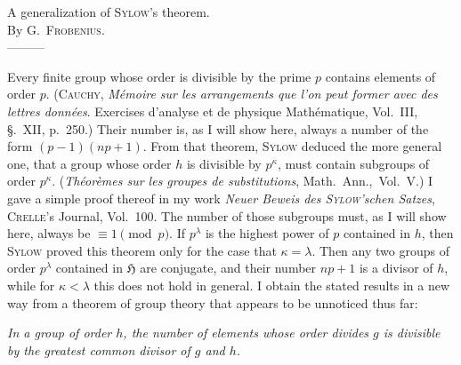 \documentclass[a5paper,12pt]{article}
\newcommand{\secformat}[1]{\centering{\normalfont\normalsize{#1}}}
\let\fr\mathfrak
\newcommand{\CH}{\fr{H}}
\newcommand{\?}{{\color{blue}${}^{(?)}$}}
\newcounter{origpagecounter}{}
\newcommand{\origpagefirst}[1]{\smash{\setcounter{origpagecounter}{#1}\mark{\arabic{origpagecounter}}}}
\begin{document}

\thispagestyle{empty}
\origpagefirst{981}

\begin{center}
	{\Large
		{A generalization of \textsc{Sylow}'s theorem.}
		\\
	}
	{\large
		{By \textsc{G.~Frobenius}.}
		\\
		---------
	}
\end{center}



\noindent
%
Every finite group whose order
is divisible by the prime $p$
contains elements of order $p$.
%
%
(\textsc{Cauchy}, 
\emph{M\'emoire sur les arrangements que l'on peut former avec des lettres donn\'ees}.
Exercises d'analyse et de physique Math\'ematique,
Vol.~III,
\S.~XII,
p.~250.)
%
%
Their number is, 
as I will show here,
always a number of the form 
$(p - 1) (n p + 1)$.
%
%
From that theorem,
\textsc{Sylow} deduced the more general one,
that a group
whose order $h$ is divisible by $p^\kappa$,
must contain subgroups of order $p^\kappa$.
%
%
(\emph{Th\'eor\`emes sur les groupes de substitutions},
Math.~Ann.,~Vol.~V.)
%
%
I gave a simple proof thereof
in my work
\emph{Neuer Beweis des \textsc{Sylow}'schen Satzes},
\textsc{Crelle}'s Journal,
Vol.~100.
%
%
The number of those subgroups must,
as I will show here,
always be $\equiv 1 \pmod{p}$.
%
%
If $p^\lambda$ is the highest power of $p$
contained in $h$,
then \textsc{Sylow} proved this theorem
only for the case that $\kappa = \lambda$.
%
%
Then any two groups of order $p^\lambda$ 
contained in $\CH$
are conjugate,
and their number $n p + 1$
is a divisor of $h$,
while for $\kappa < \lambda$
this does not hold in general.
%
%
I obtain the stated results 
in a new way
from a theorem of group theory
that appears to be unnoticed thus far:


\emph{ %
In a group of order $h$,
the number of elements
whose order divides $g$
is divisible by 
the greatest common divisor
of $g$ and $h$.
}



\subsubsection*{\secformat{\S.~1.}}
\end{document}
